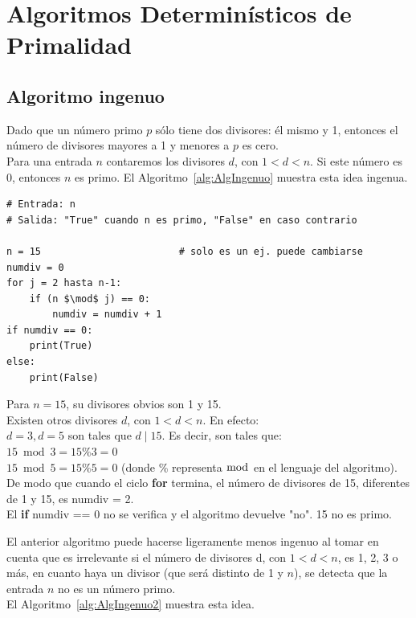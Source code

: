 \chapter{Algoritmos Determinísticos de Primalidad}
\section{Algoritmo ingenuo}
Dado que un número primo $p$ sólo tiene dos divisores: él mismo y 1, entonces el número de divisores mayores a 1 y menores a $p$ es cero. \\
Para una entrada $n$ contaremos los divisores $d$, con $1 < d < n$.
Si este número es 0, entonces $n$ es primo.
El Algoritmo~\ref{alg:AlgIngenuo} muestra esta idea ingenua.

\begin{lstlisting}[caption={Algoritmo ingenuo de testeo de primalidad}, label={alg:AlgIngenuo}, mathescape=true]
# Entrada: n
# Salida: "True" cuando n es primo, "False" en caso contrario

n = 15                        # solo es un ej. puede cambiarse
numdiv = 0 
for j = 2 hasta n-1: 
    if (n $\mod$ j) == 0:    
        numdiv = numdiv + 1
if numdiv == 0:
    print(True)
else:
    print(False)
\end{lstlisting}

\begin{ejemplo} Para $n = 15$, su divisores obvios son 1 y 15. \\
Existen otros divisores $d$, con $1 < d < n$. En efecto: \\
$d = 3, d = 5$ son tales que $d \mid 15$. Es decir, son tales que: \\
$15 \bmod 3 = 15 \% 3 = 0$ \\
$15 \bmod 5 = 15 \% 5 = 0$ (donde \% representa $\bmod$ en el lenguaje del algoritmo). \\
De modo que cuando el ciclo \textbf{for} termina, el número de divisores de 15, diferentes de 1 y 15, es numdiv = 2. \\
El \textbf{if} numdiv == 0 no se verifica y el algoritmo devuelve "no". 15 no es primo.
\end{ejemplo}

\vspace{\baselineskip}
\noindent El anterior algoritmo puede hacerse ligeramente menos ingenuo al tomar en cuenta que es irrelevante si el número de divisores d, con $1 < d < n$, es 1, 2, 3 o más, en cuanto haya un divisor (que será distinto de 1 y $n$), se detecta que la entrada $n$ no es un número primo. \\
El Algoritmo~\ref{alg:AlgIngenuo2} muestra esta idea.

